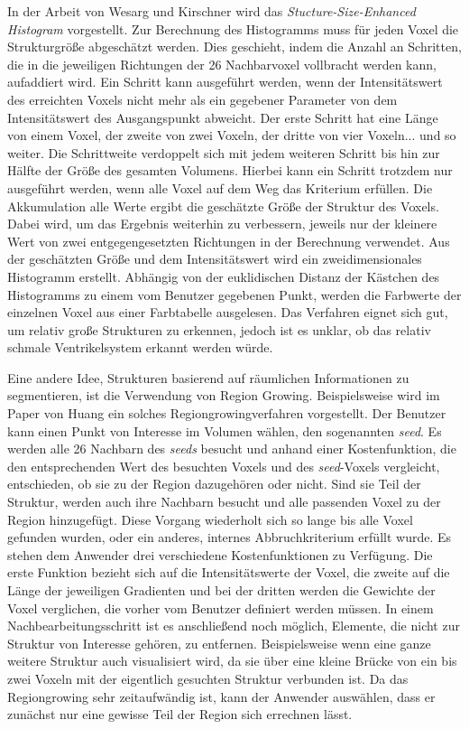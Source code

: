 In der Arbeit von Wesarg und Kirschner \cite{wesarg2009structure, wesarg20102d} wird das \textit{Stucture-Size-Enhanced Histogram} vorgestellt.
Zur Berechnung des Histogramms  muss für jeden Voxel die Strukturgröße abgeschätzt werden. Dies geschieht, indem die Anzahl an Schritten, die in die jeweiligen Richtungen der 26 Nachbarvoxel vollbracht werden kann, aufaddiert wird. Ein Schritt kann ausgeführt werden, wenn der Intensitätswert des erreichten Voxels nicht mehr als ein gegebener Parameter von dem Intensitätswert des Ausgangspunkt abweicht.
\newline
Der erste Schritt hat eine Länge von einem Voxel, der zweite von zwei Voxeln, der dritte von vier Voxeln... und so weiter. Die Schrittweite verdoppelt sich mit jedem weiteren Schritt bis hin zur Hälfte der Größe des gesamten Volumens. Hierbei kann ein Schritt trotzdem nur ausgeführt werden, wenn alle Voxel auf dem Weg das Kriterium erfüllen. Die Akkumulation alle Werte ergibt die geschätzte Größe der Struktur des Voxels. Dabei wird, um das Ergebnis weiterhin zu verbessern,  jeweils nur der kleinere Wert von zwei entgegengesetzten Richtungen in der Berechnung verwendet. 
Aus der geschätzten Größe und dem Intensitätswert wird ein zweidimensionales Histogramm erstellt. Abhängig von der euklidischen Distanz der Kästchen des Histogramms zu einem vom Benutzer gegebenen Punkt, werden die Farbwerte der einzelnen Voxel aus einer Farbtabelle ausgelesen.
\newline
Das Verfahren eignet sich gut, um relativ große Strukturen zu erkennen, jedoch ist es unklar, ob das relativ schmale Ventrikelsystem erkannt werden würde.


Eine andere Idee, Strukturen basierend auf räumlichen Informationen zu segmentieren, ist die Verwendung von Region Growing.
Beispielsweise wird im Paper von Huang \cite{huang2003rgvis} ein solches Regiongrowingverfahren vorgestellt. Der Benutzer kann einen Punkt von Interesse im Volumen wählen, den sogenannten \textit{seed}. Es werden alle 26 Nachbarn des \textit{seeds} besucht und anhand einer Kostenfunktion, die den entsprechenden Wert des besuchten Voxels und des \textit{seed}-Voxels vergleicht, entschieden, ob sie zu der Region dazugehören oder nicht. Sind sie Teil der Struktur, werden auch ihre Nachbarn besucht und alle passenden Voxel zu der Region hinzugefügt. Diese Vorgang wiederholt sich so lange bis alle Voxel gefunden wurden, oder ein anderes, internes Abbruchkriterium erfüllt wurde.
\newline
Es stehen dem Anwender drei verschiedene Kostenfunktionen zu Verfügung. Die erste Funktion bezieht sich auf die Intensitätswerte der Voxel, die zweite auf die Länge der jeweiligen Gradienten und bei der dritten werden die Gewichte der Voxel verglichen, die vorher vom Benutzer definiert werden müssen.
In einem Nachbearbeitungsschritt ist es anschließend noch möglich, Elemente, die nicht zur Struktur von Interesse gehören, zu entfernen. Beispielsweise wenn eine ganze weitere Struktur auch visualisiert wird, da sie über eine kleine Brücke von ein bis zwei Voxeln mit der eigentlich gesuchten Struktur verbunden ist.
Da das Regiongrowing sehr zeitaufwändig ist, kann der Anwender auswählen, dass er zunächst nur eine gewisse Teil der Region sich errechnen lässt.


